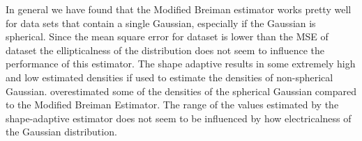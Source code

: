 
		In general we have found that the Modified Breiman estimator works pretty well for data sets that contain a single Gaussian, especially if the Gaussian is spherical. Since the mean square error for dataset \baakmanFive is lower than the MSE of dataset \baakmanFour the ellipticalness of the distribution does not seem to influence the performance of this estimator. 
		The shape adaptive \mbe results in some extremely high and low estimated densities if used to estimate the densities of non-spherical Gaussian. \sambe overestimated some of the densities of the spherical Gaussian compared to the Modified Breiman Estimator. The range of the values estimated by the shape-adaptive estimator does not seem to be influenced by how electricalness of the Gaussian distribution. 
